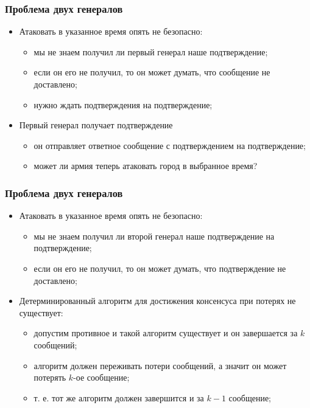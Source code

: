 \begin{frame}
\frametitle{Проблема двух генералов}
\begin{itemize}
  \item<1-> Атаковать в указанное время опять не безопасно:
    \begin{itemize}
      \item мы не знаем получил ли первый генерал наше подтверждение;
      \item если он его не получил, то он может думать, что сообщение не доставлено;
      \item нужно ждать подтверждения на подтверждение;
    \end{itemize}
  \item<2-> Первый генерал получает подтверждение
    \begin{itemize}
      \item он отправляет ответное сообщение с подтверждением на подтверждение;
      \item может ли армия теперь атаковать город в выбранное время?
    \end{itemize}
\end{itemize}
\end{frame}

\begin{frame}
\frametitle{Проблема двух генералов}
\begin{itemize}
  \item<1-> Атаковать в указанное время опять не безопасно:
    \begin{itemize}
      \item мы не знаем получил ли второй генерал наше подтверждение на подтверждение;
      \item если он его не получил, то он может думать, что подтверждение не доставлено;
    \end{itemize}
  \item<2-> Детерминированный алгоритм для достижения консенсуса при потерях не существует:
    \begin{itemize}
      \item допустим противное и такой алгоритм существует и он завершается за $k$ сообщений;
      \item алгоритм должен переживать потери сообщений, а значит он может потерять $k$-ое сообщение;
      \item т. е. тот же алгоритм должен завершится и за $k-1$ сообщение;
    \end{itemize}
\end{itemize}
\end{frame}

